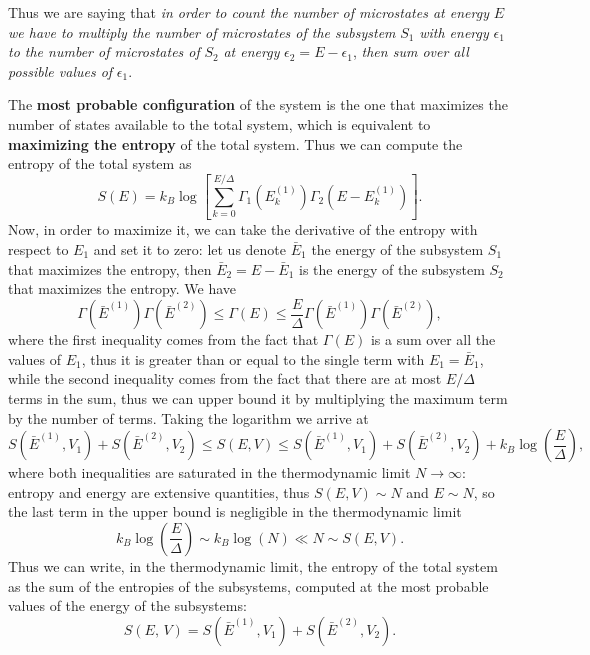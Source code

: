 Thus we are saying that \textit{in order to count the number of microstates at energy} \(E\) \textit{we have to multiply the number of microstates of the subsystem} \(S_1\) \textit{with energy} \(\epsilon_1\) \textit{to the number of microstates of} \(S_2\) \textit{at energy} \(\epsilon_2 = E - \epsilon_1\), \textit{then sum over all possible values of} \(\epsilon_1\).

The \textbf{most probable configuration} of the system is the one that maximizes the number of states available to the total system, which is equivalent to \textbf{maximizing the entropy} of the total system. Thus we can compute the entropy of the total system as
\[
    S(E) = k_B \log \left[ \sum_{k=0}^{E/\Delta} \Gamma_1(E_k^{(1)}) \Gamma_2(E-E_k^{(1)}) \right].
\]
Now, in order to maximize it, we can take the derivative of the entropy with respect to \(E_1\) and set it to zero: let us denote \(\bar{E}_1\) the energy of the subsystem \(S_1\) that maximizes the entropy, then \(\bar{E}_2 = E - \bar{E}_1\) is the energy of the subsystem \(S_2\) that maximizes the entropy. We have
\[
    \Gamma(\bar{E}^{(1)})\Gamma(\bar{E}^{(2)}) \leq \Gamma(E) \leq \frac{E}{\Delta} \Gamma(\bar{E}^{(1)})\Gamma(\bar{E}^{(2)}),
\]
where the first inequality comes from the fact that \(\Gamma(E)\) is a sum over all the values of \(E_1\), thus it is greater than or equal to the single term with \(E_1 = \bar{E}_1\), while the second inequality comes from the fact that there are at most \(E/\Delta\) terms in the sum, thus we can upper bound it by multiplying the maximum term by the number of terms. Taking the logarithm we arrive at
\[
    S(\bar{E}^{(1)}, V_1) + S(\bar{E}^{(2)}, V_2) \leq S(E, V) \leq S(\bar{E}^{(1)}, V_1) + S(\bar{E}^{(2)}, V_2) + k_B \log \left( \frac{E}{\Delta} \right),
\]
where both inequalities are saturated in the thermodynamic limit \(N \to \infty\): entropy and energy are extensive quantities, thus \(S(E, V) \sim N\) and \(E \sim N\), so the last term in the upper bound is negligible in the thermodynamic limit
\[
    k_B \log\left(\frac{E}{\Delta}\right) \sim k_B \log(N) \ll N \sim S(E, V).
\]
Thus we can write, in the thermodynamic limit, the entropy of the total system as the sum of the entropies of the subsystems, computed at the most probable values of the energy of the subsystems:
\[
    S(E,\,V) = S(\bar{E}^{(1)}, V_1) + S(\bar{E}^{(2)}, V_2).
\]

